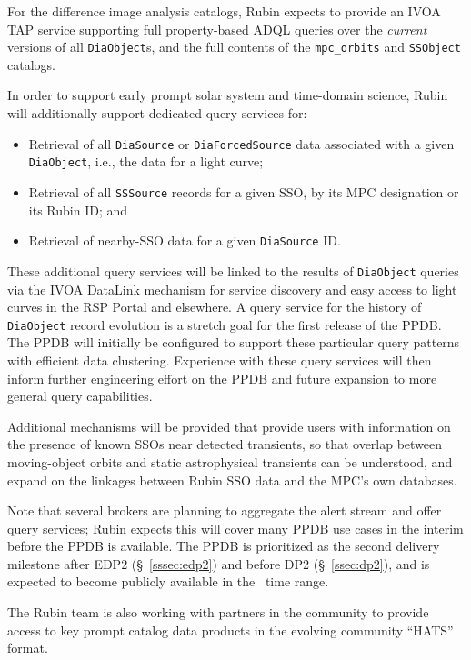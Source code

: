 For the difference image analysis catalogs, Rubin expects to provide an IVOA TAP service supporting full property-based ADQL queries over
the \emph{current} versions of all \texttt{DiaObject}s,
and the full contents of the \texttt{mpc\_orbits} and \texttt{SSObject} catalogs.

In order to support early prompt solar system and time-domain science, Rubin will additionally support dedicated query services for:
\begin{itemize}
  \item Retrieval of all \texttt{DiaSource} or \texttt{DiaForcedSource} data associated with a given \texttt{DiaObject},
i.e., the data for a light curve;
  \item Retrieval of all \texttt{SSSource} records for a given SSO, by its MPC designation or its Rubin ID; and
  \item Retrieval of nearby-SSO data for a given \texttt{DiaSource} ID.
\end{itemize}
These additional query services will be linked to the results of \texttt{DiaObject} queries via the IVOA DataLink mechanism for service discovery and easy access to light curves in the RSP Portal and elsewhere.
A query service for the history of \texttt{DiaObject} record evolution is a stretch goal for the first release of the PPDB.
The PPDB will initially be configured to support these particular query patterns with efficient data clustering.
Experience with these query services will then inform further engineering effort on the PPDB
and future expansion to more general query capabilities.

Additional mechanisms will be provided that provide users with information on the presence of known SSOs near detected transients, so that overlap between moving-object orbits and static astrophysical transients can be understood, and expand on the linkages between Rubin SSO data and the MPC's own databases.

Note that several brokers are planning to aggregate the alert stream and offer query services;
Rubin expects this will cover many PPDB use cases in the interim before the PPDB is available.
The PPDB is prioritized as the second delivery milestone after EDP2 (\S~\ref{sssec:edp2}) and before DP2 (\S~\ref{ssec:dp2}), and is expected to become publicly available in the \ppdbdate\ time range.

The Rubin team is also working with partners in the community to provide access to key prompt catalog data products in the evolving community ``HATS'' format.

